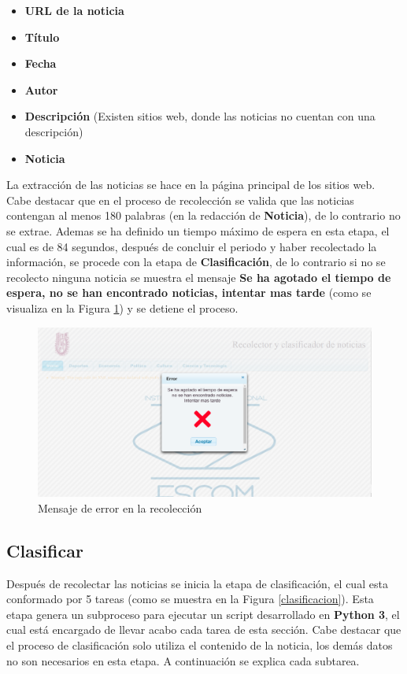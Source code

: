 \begin{itemize}
	\item \textbf{URL de la noticia}
	\item \textbf{Título}
	\item \textbf{Fecha}
	\item \textbf{Autor}
	\item \textbf{Descripción} (Existen sitios web, donde las noticias no cuentan con una descripción)
	\item \textbf{Noticia}
\end{itemize}

La extracción de las noticias se hace en la página principal de los sitios web. Cabe destacar que en el proceso de recolección se valida que las noticias contengan al menos 180 palabras (en la redacción de \textbf{Noticia}), de lo contrario no se extrae. Ademas se ha definido un tiempo máximo de espera en esta etapa, el cual es de 84 segundos, después de concluir el periodo y haber recolectado la información, se procede con la etapa de \textbf{Clasificación}, de lo contrario si no se recolecto ninguna noticia se muestra el mensaje \textbf{Se ha agotado el tiempo de espera, no se han encontrado noticias, intentar mas tarde} (como se visualiza en la Figura \ref{fig:notNoRec}) y se detiene el proceso.

\begin{figure}[H]
\centering
\includegraphics[scale=0.29]{imagenes/Capitulo5/errorConectividad.png}
\caption{Mensaje de error en la recolección}
\label{fig:notNoRec}
\end{figure}

\subsection{Clasificar}

Después de recolectar las noticias se inicia la etapa de clasificación, el cual esta conformado por 5 tareas (como se muestra en la Figura \ref{clasificacion}). Esta etapa genera un subproceso para ejecutar un script desarrollado en \textbf{Python 3}, el cual está encargado de llevar acabo cada tarea de esta sección. Cabe destacar que el proceso de clasificación solo utiliza el contenido de la noticia, los demás datos no son necesarios en esta etapa. A continuación se explica cada subtarea.

